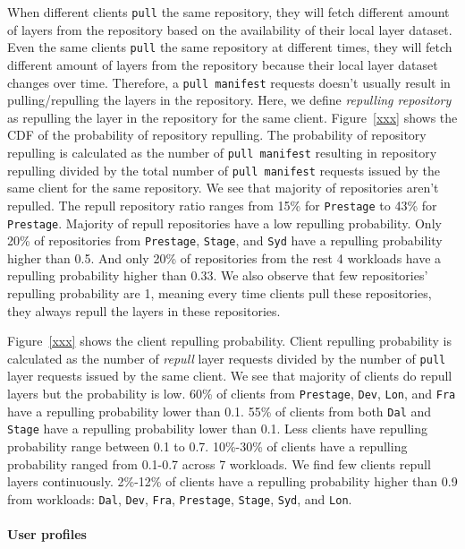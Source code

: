 When different clients \texttt{pull} the same repository, 
they will fetch different amount of layers from the repository based on the availability of their local layer dataset.
Even the same clients \texttt{pull} the same repository at different times, 
they will fetch different amount of layers from the repository because their local layer dataset changes over time.
Therefore, a \texttt{pull manifest} requests doesn't usually result in pulling/repulling the layers in the repository. 
Here, we define \emph{repulling repository} as 
repulling the layer in the repository for the same client.
Figure~\ref{xxx} shows the CDF of the probability of repository repulling.
The probability of repository repulling is calculated 
as the number of \texttt{pull manifest} resulting in repository repulling divided by 
the total number of \texttt{pull manifest} requests issued by the same client for the same repository.
We see that majority of repositories aren't repulled.
The repull repository ratio ranges from 15\% for \texttt{Prestage} to 43\% for \texttt{Prestage}.
Majority of repull repositories have a low repulling probability.
Only 20\% of repositories from  \texttt{Prestage}, \texttt{Stage}, and 
\texttt{Syd} have a repulling probability higher than 0.5.
And only 20\% of repositories from the rest 4 workloads have a repulling probability higher than 0.33.
We also observe that few repositories' repulling probability are 1, meaning 
every time clients pull these repositories, they always repull the layers in these repositories. 
 
Figure~\ref{xxx} shows the client repulling probability.
Client repulling probability is calculated as the number of \emph{repull} layer requests divided by
the number of \texttt{pull} layer requests issued by the same client.
We see that majority of clients do repull layers but the probability is low.
60\% of clients from \texttt{Prestage}, \texttt{Dev}, \texttt{Lon}, and \texttt{Fra} have a repulling probability lower than 0.1.
55\% of clients from both \texttt{Dal} and \texttt{Stage} have a repulling probability lower than 0.1.
Less clients have repulling probability range between 0.1 to 0.7.
10\%-30\% of clients have a repulling probability ranged from 0.1-0.7 across 7 workloads.
We find few clients repull layers continuously.
2\%-12\% of clients have a repulling probability higher than 0.9 from workloads:
\texttt{Dal}, \texttt{Dev}, \texttt{Fra}, \texttt{Prestage},
\texttt{Stage}, \texttt{Syd}, and \texttt{Lon}.

\paragraph{User profiles}

